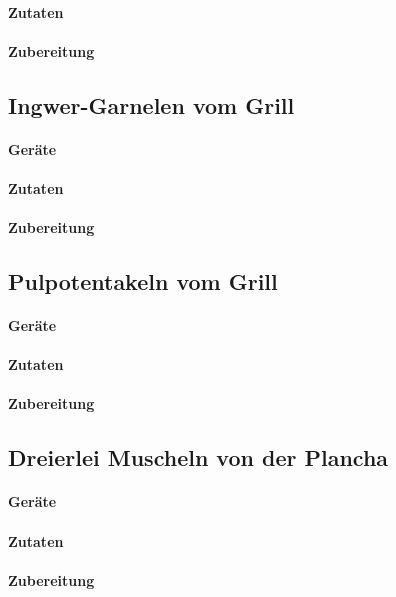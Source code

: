 \paragraph{Zutaten}

\paragraph{Zubereitung}


\subsection{Ingwer-Garnelen vom Grill}

\paragraph{Geräte}

\paragraph{Zutaten}

\paragraph{Zubereitung}


\subsection{Pulpotentakeln vom Grill}

\paragraph{Geräte}

\paragraph{Zutaten}

\paragraph{Zubereitung}


\subsection{Dreierlei Muscheln von der Plancha}

\paragraph{Geräte}

\paragraph{Zutaten}

\paragraph{Zubereitung}